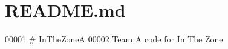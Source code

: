 \section{R\+E\+A\+D\+M\+E.\+md}

\begin{DoxyCode}
00001 # InTheZoneA
00002 Team A code for In The Zone
\end{DoxyCode}
